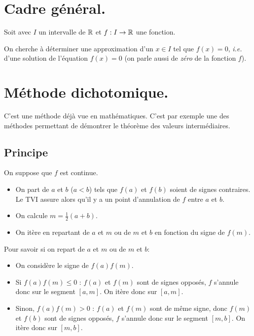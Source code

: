 %

\section{Cadre général.}

Soit avec $I$ un intervalle de $\mathbb{R}$ et $f: I\to\mathbb{R}$ une fonction.

On cherche à déterminer une approximation d'un $x\in I$ tel que $f(x)=0$, \emph{i.e.} d'une solution de l'équation $f(x) = 0$ (on parle aussi de \emph{zéro} de la fonction $f$).

\section{Méthode dichotomique.}

C'est une méthode déjà vue en mathématiques. 
C'est par exemple une des méthodes permettant de démontrer le théorème des valeurs intermédiaires.

\subsection{Principe}

On suppose que $f$ est continue.

\begin{itemize}
\item On part de $a$ et $b$ ($a<b$) tels que $f(a)$ et $f(b)$ soient de signes
  contraires. Le TVI assure alors qu'il y a un point d'annulation de $f$ entre $a$ et $b$.
\item On calcule $m=\frac{1}{2}(a+b)$.
\item On itère en repartant de $a$ et $m$ ou de $m$ et $b$ en fonction
  du signe de $f(m)$.
\end{itemize}

Pour savoir si on repart de $a$ et $m$ ou de $m$ et $b$:
\begin{itemize}
\item On considère le signe de $f(a)f(m)$.
\item Si $f(a)f(m) \leq 0$ : $f(a)$ et $f(m)$ sont de signes opposés, $f$ s'annule donc sur le segment $[a,m]$. On itère donc sur $[a,m]$.
\item Sinon, $f(a)f(m)>0$ : $f(a)$ et $f(m)$ sont de même signe, donc $f(m)$ et $f(b)$ sont
  de signes opposés, $f$ s'annule donc sur le segment $[m,b]$. On itère donc sur $[m,b]$.
\end{itemize}

